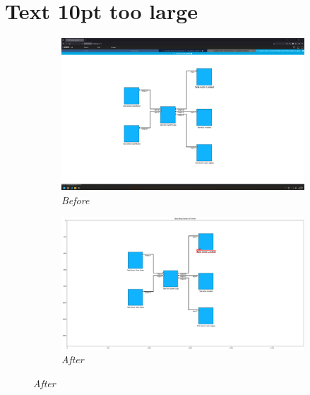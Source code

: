 \documentclass{article}
\begin{document}
\section{Text 10pt too large}
\begin{figure}[H]
    \centering
    \begin{subfigure}[t]{0.9\textwidth}
        \centering
        \includegraphics[width=\textwidth]{testcases/text_10pt_too_large/154559-088336_input_image.png}
        \caption*{\textit{Before}}
    \end{subfigure}
    \newline
    \begin{subfigure}[t]{0.9\textwidth}
        \centering
        \includegraphics[width=\textwidth]{testcases/text_10pt_too_large/154611-579883_element_bbox_errors_labeled_colored.png}
        \caption*{\textit{After}}
    \end{subfigure}
    \label{fig:text_too_large_10}
\end{figure}
\newpage
\end{document}
